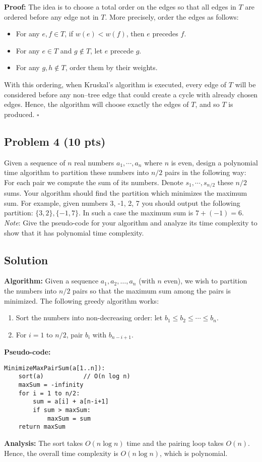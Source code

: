 \documentclass[12pt]{article}
\begin{document}
\textbf{Proof:}  
The idea is to choose a total order on the edges so that all edges in \(T\) are ordered before any edge not in \(T\). More precisely, order the edges as follows:
\begin{itemize}
    \item For any \(e,f\in T\), if \(w(e) < w(f)\), then \(e\) precedes \(f\).
    \item For any \(e\in T\) and \(g\notin T\), let \(e\) precede \(g\).
    \item For any \(g,h\notin T\), order them by their weights.
\end{itemize}
With this ordering, when Kruskal's algorithm is executed, every edge of \(T\) will be considered before any non–tree edge that could create a cycle with already chosen edges. Hence, the algorithm will choose exactly the edges of \(T\), and so \(T\) is produced. \(\square\)

\bigskip

\subsection*{Problem 4 (10 pts)}
Given a sequence of $n$ real numbers $a_1 , \cdots, a_n$ where $n$ is even, design a polynomial time algorithm to partition these numbers into $n/2$ pairs in the following way: For each pair we compute the sum of its numbers. Denote $s_1, \cdots, s_{n/2}$ these $n/2$ sums. Your algorithm should find the partition which minimizes the maximum sum. For example, given numbers 3, -1, 2, 7 you should output the following partition: $\{3, 2\}, \{-1, 7\}$. In such a case the maximum sum is $7 + (-1) = 6$.\\
\textit{Note}: Give the pseudo-code for your algorithm and analyze its time complexity to show that it has polynomial time complexity.

\subsection*{Solution}
\textbf{Algorithm:}  
Given a sequence \(a_1,a_2,\dots,a_n\) (with \(n\) even), we wish to partition the numbers into \(n/2\) pairs so that the maximum sum among the pairs is minimized. The following greedy algorithm works:
\begin{enumerate}
    \item Sort the numbers into non-decreasing order: let \(b_1 \le b_2 \le \cdots \le b_n\).
    \item For \(i=1\) to \(n/2\), pair \(b_i\) with \(b_{n-i+1}\).
\end{enumerate}
\textbf{Pseudo-code:}
\begin{verbatim}
MinimizeMaxPairSum(a[1..n]):
    sort(a)           // O(n log n)
    maxSum = -infinity
    for i = 1 to n/2:
        sum = a[i] + a[n-i+1]
        if sum > maxSum:
            maxSum = sum
    return maxSum
\end{verbatim}
\textbf{Analysis:}  
The sort takes \(O(n\log n)\) time and the pairing loop takes \(O(n)\). Hence, the overall time complexity is \(O(n\log n)\), which is polynomial.
\end{document}
